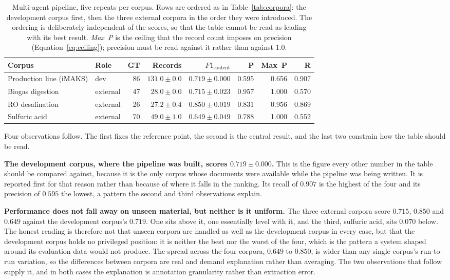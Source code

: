 \documentclass[11pt]{article}
\begin{document}
\begin{table}[H]
\centering
\caption{Multi-agent pipeline, five repeats per corpus. Rows are ordered as in
Table~\ref{tab:corpora}: the development corpus first, then the three external
corpora in the order they were introduced. The ordering is deliberately
independent of the scores, so that the table cannot be read as leading with its
best result. \emph{Max~P} is the ceiling that the record count imposes on
precision (Equation~\ref{eq:ceiling}); precision must be read against it rather
than against $1.0$.}
\label{tab:main_results}
\small
\begin{tabular}{llrrrrrr}
\toprule
\textbf{Corpus} & \textbf{Role} & \textbf{GT} & \textbf{Records} &
\textbf{$F1_{\text{content}}$} & \textbf{P} & \textbf{Max~P} & \textbf{R} \\
\midrule
Production line (iMAKS)  & dev      & 86 & $131.0 \pm 0.0$ & $0.719 \pm 0.000$ & 0.595 & 0.656 & 0.907 \\
\midrule
Biogas digestion         & external & 47 & $28.0 \pm 0.0$ & $0.715 \pm 0.023$ & 0.957 & 1.000 & 0.570 \\
RO desalination          & external & 26 & $27.2 \pm 0.4$ & $0.850 \pm 0.019$ & 0.831 & 0.956 & 0.869 \\
Sulfuric acid            & external & 70 & $49.0 \pm 1.0$ & $0.649 \pm 0.049$ & 0.788 & 1.000 & 0.552 \\
\bottomrule
\end{tabular}
\end{table}

Four observations follow. The first fixes the reference point, the second is the
central result, and the last two constrain how the table should be read.

\textbf{The development corpus, where the pipeline was built, scores
$0.719 \pm 0.000$.} This is the figure every other number in the table should be
compared against, because it is the only corpus whose documents were available
while the pipeline was being written. It is reported first for that reason rather
than because of where it falls in the ranking. Its recall of $0.907$ is the
highest of the four and its precision of $0.595$ the lowest, a pattern the second
and third observations explain.

\textbf{Performance does not fall away on unseen material, but neither is it
uniform.} The three external corpora score $0.715$, $0.850$ and $0.649$ against
the development corpus's $0.719$. One sits above it, one essentially level with
it, and the third, sulfuric acid, sits $0.070$ below. The honest reading is
therefore not that unseen corpora are handled as well as the development corpus
in every case, but that the development corpus holds no privileged position: it
is neither the best nor the worst of the four, which is the pattern a system
shaped around its evaluation data would not produce. The spread across the four
corpora, $0.649$ to $0.850$,
is wider than any single corpus's run-to-run variation, so the differences
between corpora are real and demand explanation rather than averaging. The two
observations that follow supply it, and in both cases the explanation is
annotation granularity rather than extraction error.
\end{document}
